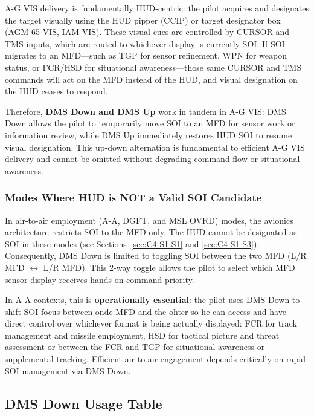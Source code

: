 \documentclass[11pt, a4paper, twoside]{report}
\begin{document}
A-G VIS delivery is fundamentally HUD-centric: the pilot acquires and designates the target visually using the HUD pipper (CCIP) or target designator box (AGM-65 VIS, IAM-VIS). These visual cues are controlled by CURSOR and TMS inputs, which are routed to whichever display is currently SOI. If SOI migrates to an MFD---such as TGP for sensor refinement, WPN for weapon status, or FCR/HSD for situational awareness---those same CURSOR and TMS commands will act on the MFD instead of the HUD, and visual designation on the HUD ceases to respond.

Therefore, \textbf{DMS Down and DMS Up} work in tandem in A-G VIS: DMS Down allows the pilot to temporarily move SOI to an MFD for sensor work or information review, while DMS Up immediately restores HUD SOI to resume visual designation. This up-down alternation is fundamental to efficient A-G VIS delivery and cannot be omitted without degrading command flow or situational awareness.

\subsubsection{Modes Where HUD is NOT a Valid SOI Candidate}
\label{sec:C4-S3-S1-S2}

In air-to-air employment (A-A, DGFT, and MSL OVRD) modes, the avionics architecture restricts SOI to the MFD only. The HUD cannot be designated as SOI 
in these modes (see Sections~\ref{sec:C4-S1-S1} and \ref{sec:C4-S1-S3}). Consequently, DMS Down is limited to toggling SOI between the two MFD (L/R MFD $\leftrightarrow$ L/R MFD). This 2-way toggle allows the pilot to select which MFD sensor display receives hands-on command priority.

In A-A contexts, this is \textbf{operationally essential}: the pilot uses DMS Down to shift SOI focus between onde MFD and the ohter so he can access and have direct control over whichever format is being actually displayed: FCR for track management and missile employment, HSD for tactical picture and threat assessment or between the FCR and TGP for situational awareness or supplemental tracking. Efficient air-to-air engagement depends critically on rapid SOI management via DMS Down.

\subsection{DMS Down Usage Table}
\label{sec:C4-S3-S2}
\end{document}
